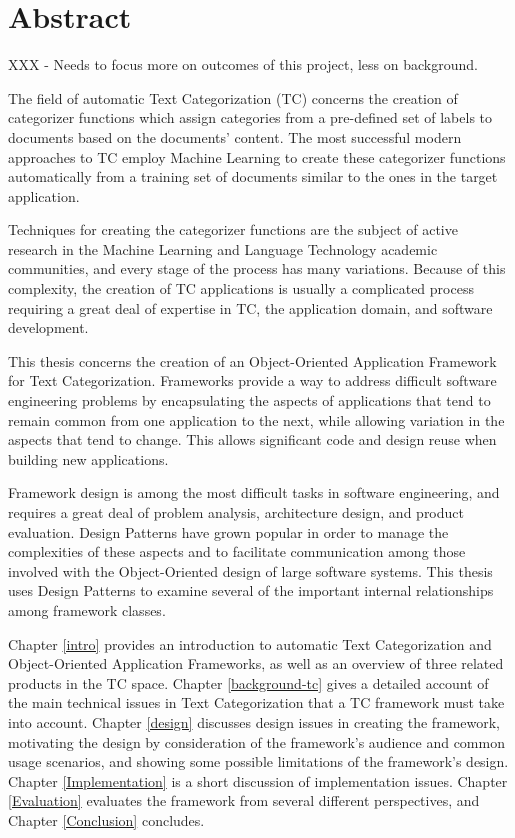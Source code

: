 \chapter{Abstract}

XXX - Needs to focus more on outcomes of this project, less on background.

The field of automatic Text Categorization (TC) concerns the creation
of categorizer functions which assign categories from a pre-defined
set of labels to documents based on the documents' content.  The most
successful modern approaches to TC employ Machine Learning to create
these categorizer functions automatically from a training set of
documents similar to the ones in the target application.

Techniques for creating the categorizer functions are the subject of
active research in the Machine Learning and Language Technology academic
communities, and every stage of the process has many variations.
Because of this complexity, the creation of TC applications is usually
a complicated process requiring a great deal of expertise in TC, the
application domain, and software development.

This thesis concerns the creation of an Object-Oriented Application
Framework for Text Categorization.  Frameworks provide a way to
address difficult software engineering problems by encapsulating the
aspects of applications that tend to remain common from one
application to the next, while allowing variation in the aspects that
tend to change.  This allows significant code and design reuse when
building new applications.

Framework design is among the most difficult tasks in software
engineering, and requires a great deal of problem analysis,
architecture design, and product evaluation.  Design Patterns have
grown popular in order to manage the complexities of these aspects and
to facilitate communication among those involved with the
Object-Oriented design of large software systems.  This thesis uses
Design Patterns to examine several of the important internal
relationships among framework classes.

Chapter \ref{intro} provides an introduction to automatic Text
Categorization and Object-Oriented Application Frameworks, as well as
an overview of three related products in the TC space.
Chapter \ref{background-tc} gives a detailed account of the main technical
issues in Text Categorization that a TC framework must take into
account.  Chapter \ref{design} discusses design issues in creating the
framework, motivating the design by consideration of the
framework's audience and common usage scenarios, and showing some
possible limitations of the framework's design.  Chapter
\ref{Implementation} is a short discussion of implementation issues.
Chapter \ref{Evaluation} evaluates the framework from several
different perspectives, and Chapter \ref{Conclusion} concludes.

